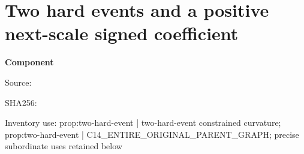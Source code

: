 \chapter{Two hard events and a positive next-scale signed coefficient}
\label{component:pf47f6a4e3a60}
\noindent\textbf{Component }\par
{\small\noindent Source: \par}
{\small\noindent SHA256: \par}
{\small\noindent Inventory use: prop:two-hard-event | two-hard-event constrained curvature; prop:two-hard-event | C14\_\allowbreak{}ENTIRE\_\allowbreak{}ORIGINAL\_\allowbreak{}PARENT\_\allowbreak{}GRAPH; precise subordinate uses retained below\par}
\medskip
